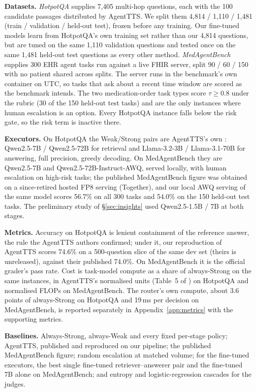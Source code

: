 \documentclass{article}
\begin{document}
\textbf{Datasets.} \emph{HotpotQA} \citep{yang2018hotpotqa} supplies 7,405 multi-hop questions, each with the 100 candidate passages distributed by AgentTTS. We split them 4,814 / 1,110 / 1,481 (train / validation / held-out test), frozen before any training. Our fine-tuned models learn from HotpotQA's own training set rather than our 4,814 questions, but are tuned on the same 1,110 validation questions and tested once on the same 1,481 held-out test questions as every other method. \emph{MedAgentBench} \citep{jiang2025medagentbench} supplies 300 EHR agent tasks run against a live FHIR server, split 90 / 60 / 150 with no patient shared across splits. The server runs in the benchmark's own container on UTC, so tasks that ask about a recent time window are scored as the benchmark intends. The two medication-order task types score $\tau\ge0.8$ under the rubric (30 of the 150 held-out test tasks) and are the only instances where human escalation is an option. Every HotpotQA instance falls below the risk gate, so the risk term is inactive there.

\textbf{Executors.} On HotpotQA the Weak/Strong pairs are AgentTTS's own \citep{qwen2025qwen25,grattafiori2024llama3}: Qwen2.5-7B / Qwen2.5-72B for retrieval and Llama-3.2-3B / Llama-3.1-70B for answering, full precision, greedy decoding. On MedAgentBench they are Qwen2.5-7B and Qwen2.5-72B-Instruct-AWQ, served locally, with human escalation on high-risk tasks; the published MedAgentBench figure was obtained on a since-retired hosted FP8 serving (Together), and our local AWQ serving of the same model scores 56.7\% on all 300 tasks and 54.0\% on the 150 held-out test tasks. The preliminary study of \S\ref{sec:insights} used Qwen2.5-1.5B / 7B at both stages.

\textbf{Metrics.} Accuracy on HotpotQA is lenient containment of the reference answer, the rule the AgentTTS authors confirmed; under it, our reproduction of AgentTTS scores 74.6\% on a 500-question slice of the same dev set (theirs is unreleased), against their published 74.0\%. On MedAgentBench it is the official grader's pass rate. Cost is task-model compute as a share of always-Strong on the same instances, in AgentTTS's normalised units (Table~5 of \citealp{wang2025agenttts}) on HotpotQA and normalised FLOPs on MedAgentBench. The router's own compute, about 3.6 points of always-Strong on HotpotQA and 19\,ms per decision on MedAgentBench, is reported separately in Appendix~\ref{app:metrics} with the supporting metrics.

\textbf{Baselines.} Always-Strong, always-Weak and every fixed per-stage policy; AgentTTS, published and reproduced on our pipeline; the published MedAgentBench figure; random escalation at matched volume; for the fine-tuned executors, the best single fine-tuned retriever--answerer pair and the fine-tuned 7B alone on MedAgentBench; and entropy and logistic-regression cascades for the judges. 
\end{document}
